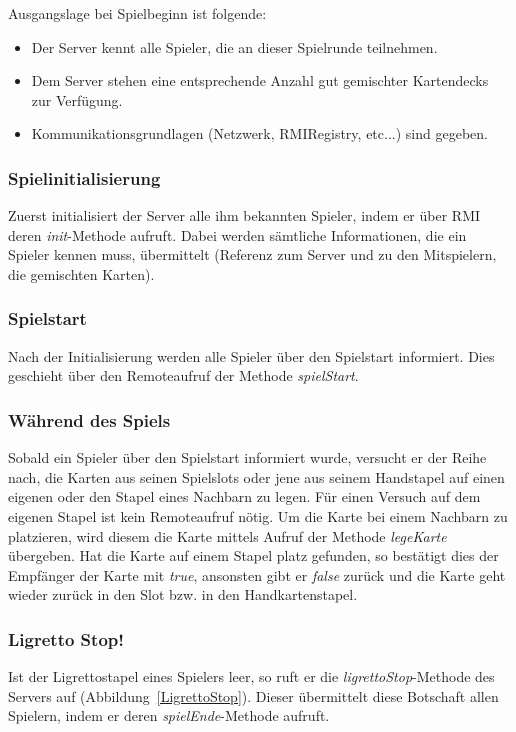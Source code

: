 Ausgangslage bei Spielbeginn ist folgende:
\begin{itemize}
	\item Der Server kennt alle Spieler, die an dieser Spielrunde teilnehmen.
	\item Dem Server stehen eine entsprechende Anzahl gut gemischter Kartendecks zur Verfügung.
	\item Kommunikationsgrundlagen (Netzwerk, RMIRegistry, etc...) sind gegeben.
\end{itemize}

\subsubsection{Spielinitialisierung}
Zuerst initialisiert der Server alle ihm bekannten Spieler, indem er über RMI deren \textit{init}-Methode aufruft. Dabei werden sämtliche Informationen, die ein Spieler kennen muss, übermittelt (Referenz zum Server und zu den Mitspielern, die gemischten Karten).

\subsubsection{Spielstart}
Nach der Initialisierung werden alle Spieler über den Spielstart informiert. Dies geschieht über den Remoteaufruf der Methode \textit{spielStart}.

\subsubsection{Während des Spiels}
Sobald ein Spieler über den Spielstart informiert wurde, versucht er der Reihe nach, die Karten aus seinen Spielslots oder jene aus seinem Handstapel auf einen eigenen oder den Stapel eines Nachbarn zu legen. Für einen Versuch auf dem eigenen Stapel ist kein Remoteaufruf nötig. Um die Karte bei einem Nachbarn zu platzieren, wird diesem die Karte mittels Aufruf der Methode \textit{legeKarte} übergeben. Hat die Karte auf einem Stapel platz gefunden, so bestätigt dies der Empfänger der Karte mit \textit{true}, ansonsten gibt er \textit{false} zurück und die Karte geht wieder zurück in den Slot bzw. in den Handkartenstapel.

\subsubsection{Ligretto Stop!}
Ist der Ligrettostapel eines Spielers leer, so ruft er die \textit{ligrettoStop}-Methode des Servers auf (Abbildung~\ref{LigrettoStop}). Dieser übermittelt diese Botschaft allen Spielern, indem er deren \textit{spielEnde}-Methode aufruft.

